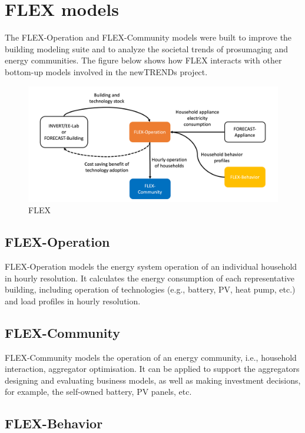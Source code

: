 \section{FLEX models}

The FLEX-Operation and FLEX-Community models were built to improve the building modeling suite and to analyze the societal trends of prosumaging and energy communities.
The figure below shows how FLEX interacts with other bottom-up models involved in the newTRENDs project.

\begin{figure}[h]
  \centering
  \includegraphics[width=\textwidth]{Images/flex.png}
  \caption{FLEX}
\end{figure}

\subsection{FLEX-Operation}

FLEX-Operation models the energy system operation of an individual household in hourly resolution.  
It calculates the energy consumption of each representative building, including operation of technologies (e.g., battery, PV, heat pump, etc.) and load profiles in hourly resolution.

\subsection{FLEX-Community}

FLEX-Community models the operation of an energy community, i.e., household interaction, aggregator optimisation. 
It can be applied to support the aggregators designing and evaluating business models, as well as making investment decisions, for example, the self-owned battery, PV panels, etc.

\subsection{FLEX-Behavior}

